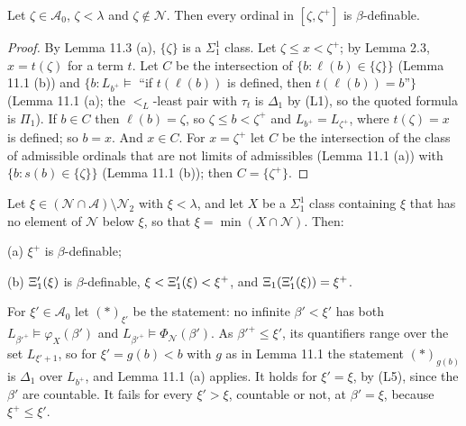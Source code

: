 \documentclass[11pt]{article}
\begin{document}
\begin{statement} Let $\zeta \in \mathcal A_0$, $\zeta < \lambda$ and $\zeta \notin \mathcal N$. Then
every ordinal in $[\zeta, \zeta^+]$ is $\beta$-definable.
\end{statement}

\begin{proof} By Lemma 11.3 (a), $\{\zeta\}$ is a $\Sigma^1_1$ class. Let $\zeta \le x < \zeta^+$; by Lemma 2.3,
$x = t(\zeta)$ for a term $t$. Let $C$ be the intersection of $\{b : \ell(b) \in \{\zeta\}\}$ (Lemma 11.1 (b)) and
$\{b : L_{b^+} \models$ ``if $t(\ell(b))$ is defined, then $t(\ell(b)) = b$''$\}$ (Lemma 11.1 (a); the
$<_L$-least pair with $\tau_t$ is $\Delta_1$ by (L1), so the quoted formula is $\Pi_1$). If $b \in C$ then
$\ell(b) = \zeta$, so $\zeta \le b < \zeta^+$ and $L_{b^+} = L_{\zeta^+}$, where $t(\zeta) = x$ is defined; so
$b = x$. And $x \in C$. For $x = \zeta^+$ let $C$ be the intersection of the class of admissible ordinals that are
not limits of admissibles (Lemma 11.1 (a)) with $\{b : s(b) \in \{\zeta\}\}$ (Lemma 11.1 (b)); then
$C = \{\zeta^+\}$.
\end{proof}

\begin{statement} Let $\xi \in (\mathcal N \cap \mathcal A) \setminus \mathcal N_2$ with
$\xi < \lambda$, and let $X$ be a $\Sigma^1_1$ class containing $\xi$ that has no element of $\mathcal N$ below $\xi$,
so that $\xi = \min(X \cap \mathcal N)$. Then:

(a) $\xi^+$ is $\beta$-definable;

(b) $\Xi'_1(\xi)$ is $\beta$-definable, $\xi < \Xi'_1(\xi) < \xi^+$, and $\Xi_1(\Xi'_1(\xi)) = \xi^+$.
\end{statement}

For $\xi' \in \mathcal A_0$ let $(\ast)_{\xi'}$ be the statement: no infinite $\beta' < \xi'$ has both
$L_{\beta'^+} \models \varphi_X(\beta')$ and $L_{\beta'^+} \models \Phi_{\mathcal N}(\beta')$. As
$\beta'^+ \le \xi'$, its quantifiers range over the set $L_{\xi'+1}$, so for $\xi' = g(b) < b$ with $g$ as in Lemma
11.1 the statement $(\ast)_{g(b)}$ is $\Delta_1$ over $L_{b^+}$, and Lemma 11.1 (a) applies. It holds for $\xi' = \xi$, by
(L5), since the $\beta'$ are countable. It fails for every $\xi' > \xi$, countable or not, at $\beta' = \xi$,
because $\xi^+ \le \xi'$.
\end{document}
